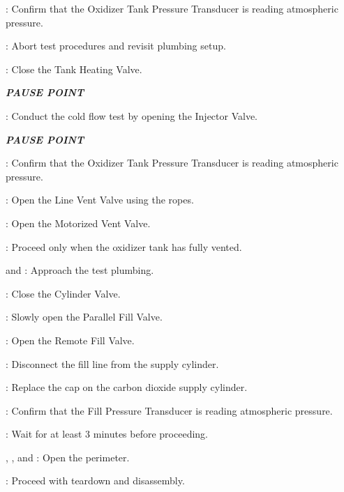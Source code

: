 \begin{checklist}
\begin{checklist}[label=$\bullet$]
\begin{checklist}
            \item \daq{}: Confirm that the Oxidizer Tank Pressure Transducer is reading atmospheric pressure.
            \item \ops{}: Abort test procedures and revisit plumbing setup.
        \end{checklist}
    \end{checklist}
    \item \heat: Close the Tank Heating Valve.
    \item \textbf{\textit{PAUSE POINT}}
    \item \control{}: Conduct the cold flow test by opening the Injector Valve.
    \item \textbf{\textit{PAUSE POINT}}
    \item \daq{}: Confirm that the Oxidizer Tank Pressure Transducer is reading atmospheric pressure.
    \item \primary{}: Open the Line Vent Valve using the ropes.
    \item \control{}: Open the Motorized Vent Valve.
    \item \ops{}: Proceed only when the oxidizer tank has fully vented.
    \item \primary{} and \secondary: Approach the test plumbing.
    \item \primary{}: Close the Cylinder Valve.
    \item \primary{}: Slowly open the Parallel Fill Valve.
    \item \control{}: Open the Remote Fill Valve.
    \item \primary{}: Disconnect the fill line from the supply cylinder.
    \item \primary{}: Replace the cap on the carbon dioxide supply cylinder.
    \item \daq{}: Confirm that the Fill Pressure Transducer is reading atmospheric pressure.
    \item \ops{}: Wait for at least 3 minutes before proceeding.
    \item \peri{}, \perii{}, and \periii{}: Open the perimeter.
    \item \ops{}: Proceed with teardown and disassembly.
\end{checklist}

